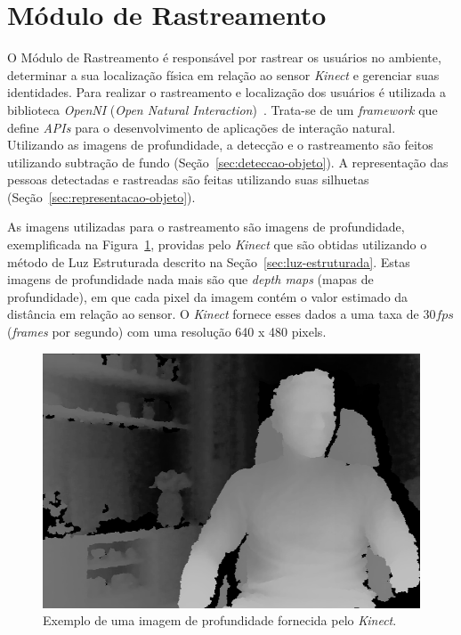 \section{Módulo de Rastreamento}

	O Módulo de Rastreamento é responsável por rastrear os usuários no
	ambiente, determinar a sua localização física em relação ao sensor \textit{Kinect} e
	gerenciar suas identidades. Para realizar o rastreamento e localização dos
	usuários é utilizada a biblioteca \textit{OpenNI} (\textit{Open Natural
	Interaction})~\cite{OpenNI2010, PrimeSense2010}. Trata-se de um \textit{framework} que define \textit{APIs} para
	o desenvolvimento de aplicações de interação natural. Utilizando as imagens de
	profundidade, a detecção e o rastreamento são feitos utilizando subtração de
	fundo (Seção~\ref{sec:deteccao-objeto}). A representação das pessoas detectadas e rastreadas são feitas utilizando suas silhuetas (Seção~\ref{sec:representacao-objeto}).

	As imagens utilizadas para o rastreamento são imagens de profundidade,
	exemplificada na Figura~\ref{fig:depthmaps}, providas pelo \textit{Kinect} que
	são obtidas utilizando o método de Luz Estruturada descrito na
	Seção~\ref{sec:luz-estruturada}. Estas imagens de profundidade nada mais são
	que \textit{depth maps} (mapas de profundidade), em que cada pixel da imagem
	contém o valor estimado da distância em relação ao sensor. O \textit{Kinect}
	fornece esses dados a uma taxa de $\displaystyle 30 fps$ (\textit{frames} por
	segundo) com uma resolução 640 x 480 pixels.
	

	\begin{figure}[htb]
		\begin{center}
			\includegraphics[scale=0.4]{figuras/4.ProblemaEProposta/mapa-profundidade.png}
		\end{center}
		\caption{Exemplo de uma imagem de profundidade fornecida pelo \textit{Kinect}.}
		\label{fig:depthmaps}
	\end{figure}

